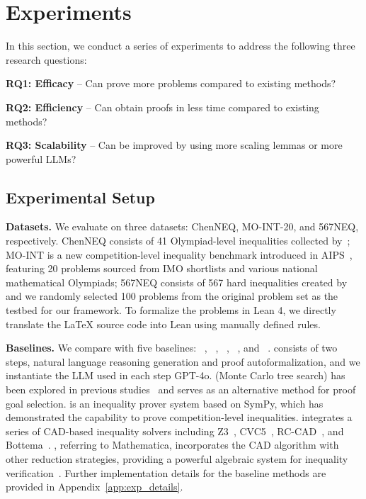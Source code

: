 \section{Experiments}
\label{sec:exp}
In this section, we conduct a series of experiments to address the following three research questions:

\textbf{RQ1: Efficacy} -- Can {\name} prove more problems compared to existing methods?

\textbf{RQ2: Efficiency} -- Can \name obtain proofs in less time compared to existing methods?

\textbf{RQ3: Scalability} -- Can \name be improved by using more scaling lemmas or more powerful LLMs?

\vspace{-0.3em}
\subsection{Experimental Setup}
\vspace{-0.3em}
\textbf{Datasets. } 
We evaluate {\name} on three datasets: ChenNEQ, MO-INT-20, and 567NEQ, respectively. 
ChenNEQ consists of 41 Olympiad-level inequalities collected by~\citet{chen2014brief};
MO-INT is a new competition-level inequality benchmark introduced in AIPS~\citep{wei2024proving}, featuring 20 problems sourced from IMO shortlists and various national mathematical Olympiads;
567NEQ consists of 567 hard inequalities created by~\citet{Tung2012Nice} 
and we randomly selected 100 problems from the original problem set as the testbed for our framework.
To formalize the problems in Lean 4, we directly translate the LaTeX source code into Lean using manually defined rules.

\textbf{Baselines. }
We compare {\name} with five baselines: \dsp~\citep{jiang2023draft}, \cad~\citep{kremer2020cylindrical}, \mma~\citep{Mathematica}, \mcts~\citep{wu2021int}, and \aips~\citep{wei2024proving}.
\dsp consists of two steps, natural language reasoning generation and proof autoformalization, and we instantiate the LLM used in each step GPT-4o.  
\mcts (Monte Carlo tree search) has been explored in previous studies~\citep{wu2021int} and serves as an alternative method for proof goal selection.
\aips is an inequality prover system based on SymPy, which has demonstrated the capability to prove competition-level inequalities.
\cad integrates a series of CAD-based inequality solvers including Z3~\citep{de2008z3}, CVC5~\citep{kremer2022cooperating}, RC-CAD~\citep{lemaire2005regularchains}, and Bottema~\citep{lu1998practical}. 
\mma, referring to Mathematica, incorporates the CAD algorithm with other reduction strategies, providing a powerful algebraic system for inequality verification~\citep{wolfram_2024_rps}.
Further implementation details for the baseline methods are provided in Appendix~\ref{app:exp_details}.

